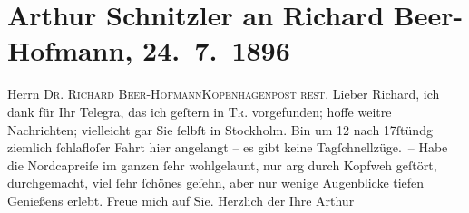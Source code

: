 

         
         \renewcommand{\erwaehntePersonen}{Personen: Richard Beer-Hofmann}
         \renewcommand{\erwaehnteOrte}{Orte: Kopenhagen, Nordkap, Oslo, Stockholm, Trondheim}
         \renewcommand{\erwaehnteWerke}{}
               \section[Arthur Schnitzler an Richard Beer-Hofmann, 24. 7. 1896]{ Arthur Schnitzler an Richard Beer-Hofmann, 24. 7. 1896}\nopagebreak{}\rehead{ }\begin{ledgroupsized}[t]{13cm}\normalsize\beginnumbering{} \toendnotes[C]{\smallbreak\pagebreak[2]} 
\pstart{}{\pb}Herrn \textsc{Dr. Richard
                     Beer-Hofmann}\pend{}\pstart{}\textsc{Kopenhagen}\pend{}\pstart{}\textsc{post rest.}\pend{}{\bigskip}\pstart
           \noindent{}{\pb}Lieber Richard, ich dank für Ihr Telegra{\geminationm}, das ich geſtern in \textsc{Tr}. vorgefunden; hoffe weitre Nachrichten;
               vielleicht gar Sie ſelbſt in Stockholm. Bin um
                  12 nach 17ſtündg ziemlich ſchlafloſer Fahrt hier angelangt – es gibt
               keine {\pb}Tagſchnellzüge. – Habe die Nordcapreiſe im ganzen ſehr wohlgelaunt, nur arg durch Kopfweh
               geſtört, durchgemacht, viel ſehr ſchönes geſehn, aber nur wenige Augenblicke tiefen
               Genießens erlebt. Freue mich auf Sie. Herzlich der Ihre \spacefill\mbox{Arthur}\pend
           
         
         \endnumbering{}\end{ledgroupsized}  \newcommand{\dateiname}{L00567}\newcommand{\titel}{Arthur Schnitzler an Richard Beer-Hofmann, 24. 7. 1896}\newcommand{\editorInnen}{Martin Anton Müller und Gerd-Hermann Susen}
      